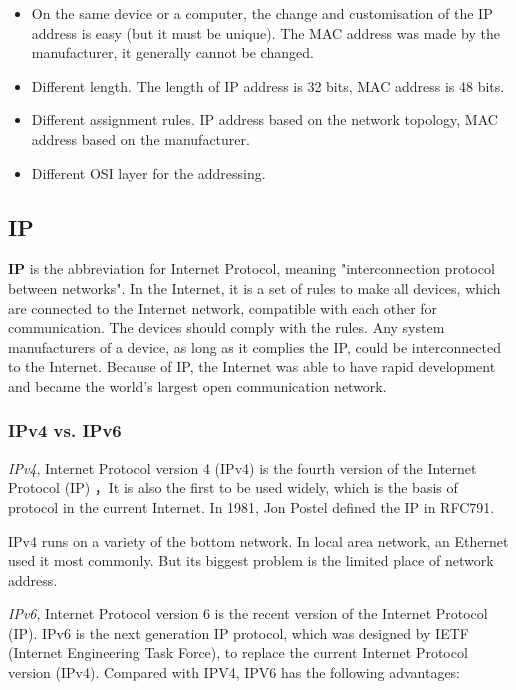 \begin{itemize}
	\item On the same device or a computer, the change and customisation of the IP address is easy (but it must be unique). The MAC address was made by the manufacturer, it generally cannot be changed.
	\item Different length. The length of IP address is 32 bits, MAC address is 48 bits.
	\item Different assignment rules. IP address based on the network topology, MAC address based on the manufacturer.
	\item Different OSI layer for the addressing.
\end{itemize}

\subsection{IP}

\textbf{IP} is the abbreviation for Internet Protocol, meaning "interconnection protocol between networks". In the Internet, it is a set of rules to make all devices, which are connected to the Internet network, compatible with each other for communication. The devices should comply with the rules. Any system manufacturers of a device, as long as it complies the IP, could be interconnected to the Internet. Because of IP, the Internet was able to have rapid development and became the world's largest open communication network.  

\subsubsection{IPv4 vs. IPv6}

\textit{IPv4}, Internet Protocol version 4 (IPv4) is the fourth version of the Internet Protocol (IP) ，It is also the first to be used widely, which is the basis of protocol in the current Internet. In 1981, Jon Postel defined the IP in RFC791.  

IPv4 runs on a variety of the bottom network. In local area network, an Ethernet used it most commonly. But its biggest problem is the limited place of network address.  

\textit{IPv6}, Internet Protocol version 6 is the recent version of the Internet Protocol (IP). IPv6 is the next generation IP protocol, which was designed by IETF (Internet Engineering Task Force), to replace the current Internet Protocol version (IPv4).  
Compared with IPV4, IPV6 has the following advantages:  

